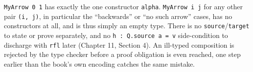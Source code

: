 \texttt{MyArrow 0 1} has exactly the one constructor \texttt{alpha}. \texttt{MyArrow i j} for any other pair \texttt{(i, j)}, in particular the ``backwards'' or ``no such arrow'' cases, has no constructors at all, and is thus simply an empty type. There is no \texttt{source}/\texttt{target} to state or prove separately, and no \texttt{h : Q.source a = v} side-condition to discharge with \texttt{rfl} later (Chapter 11, Section 4). An ill-typed composition is rejected by the type checker before a proof obligation is even reached, one step earlier than the book's own encoding catches the same mistake.
